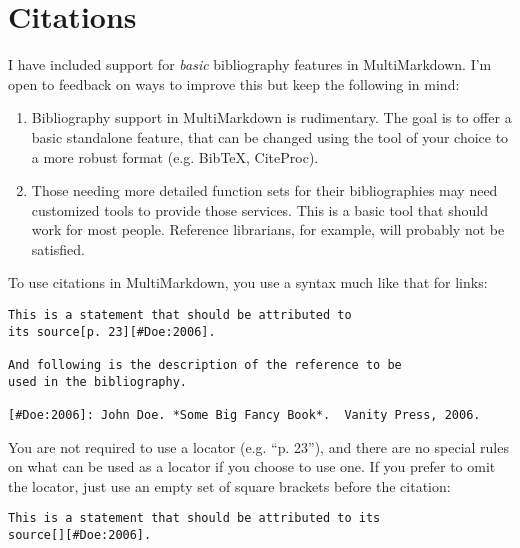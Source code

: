 
\def\mytitle{Citations}
\def\myauthor{Fletcher T. Penney}
\def\revised{2018-06-27}




\tableofcontents

\section{Citations}
\label{citations}

I have included support for \emph{basic} bibliography features in MultiMarkdown. I'm open to feedback on ways to improve this but keep the following in mind:

\begin{enumerate}
\item Bibliography support in MultiMarkdown is rudimentary. The goal is to offer a basic standalone feature, that can be changed using the tool of your choice to a more robust format (e.g. BibTeX, CiteProc).

\item Those needing more detailed function sets for their bibliographies may need customized tools to provide those services. This is a basic tool that should work for most people. Reference librarians, for example, will probably not be satisfied.

\end{enumerate}

To use citations in MultiMarkdown, you use a syntax much like that for links:

\begin{verbatim}
This is a statement that should be attributed to
its source[p. 23][#Doe:2006].

And following is the description of the reference to be
used in the bibliography.

[#Doe:2006]: John Doe. *Some Big Fancy Book*.  Vanity Press, 2006.
\end{verbatim}

You are not required to use a locator (e.g. ``p. 23''), and there are no special rules on what can be used as a locator if you choose to use one. If you prefer to omit the locator, just use an empty set of square brackets before the citation:

\begin{verbatim}
This is a statement that should be attributed to its 
source[][#Doe:2006].
\end{verbatim}

